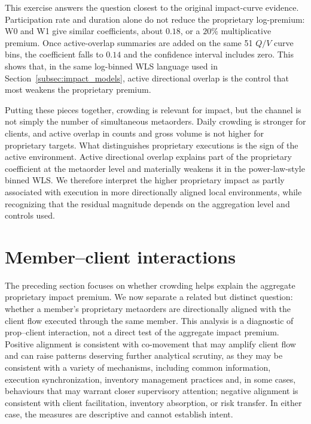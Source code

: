 \documentclass[11pt]{article}
\begin{document}
This exercise answers the question closest to the original impact-curve
evidence. Participation rate and duration alone do not reduce the proprietary
log-premium: W0 and W1 give similar coefficients, about \(0.18\), or a \(20\%\)
multiplicative premium. Once active-overlap summaries are added on the same 51
\(Q/V\) curve bins, the coefficient falls to \(0.14\) and the confidence interval
includes zero. This shows that, in the same log-binned WLS language used in
Section~\ref{subsec:impact_models}, active directional overlap is the control
that most weakens the proprietary premium.

Putting these pieces together, crowding is relevant for impact, but the channel
is not simply the number of simultaneous metaorders. Daily crowding is stronger
for clients, and active overlap in counts and gross volume is not higher for
proprietary targets. What distinguishes proprietary executions is the sign of
the active environment. Active directional overlap explains part of the
proprietary coefficient at the metaorder level and materially weakens it in the
power-law-style binned WLS. We therefore interpret the higher proprietary impact
as partly associated with execution in more directionally aligned local
environments, while recognizing that the residual magnitude depends on the
aggregation level and controls used.

\section{Member--client interactions}
\label{sec:member_prop_client_alignment}

The preceding section focuses on whether crowding helps explain the aggregate proprietary impact
premium. We now separate a related but distinct question: whether a member's proprietary metaorders
are directionally aligned with the client flow executed through the same member. This analysis is a
diagnostic of prop--client interaction, not a direct test of the aggregate impact premium. Positive
alignment is consistent with co-movement that may amplify client flow and can raise patterns deserving 
further analytical scrutiny, as they may be consistent with a variety of mechanisms, including common 
information, execution synchronization, inventory management practices and, in some cases, behaviours 
that may warrant closer supervisory attention; negative alignment is consistent with client facilitation, 
inventory absorption, or risk transfer. In either case, the measures are descriptive and cannot establish intent.
\end{document}
